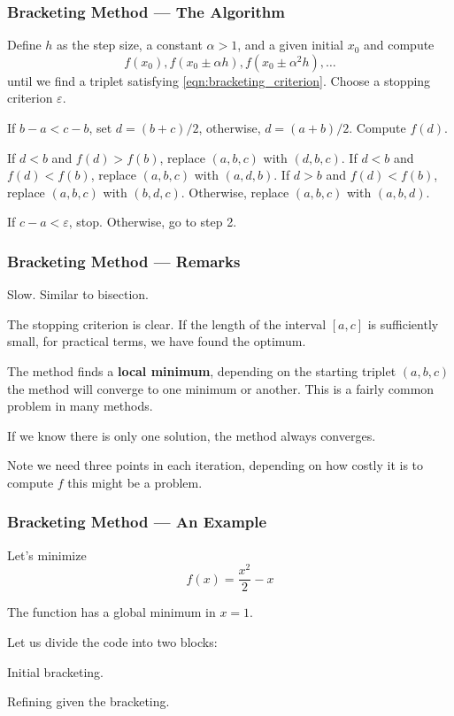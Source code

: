 \documentclass[11pt,xcolor={svgnames},aspectratio=169,usepdftitle=false]{beamer}
\let\toneitemize\itemize
\let\ttwoitemize\enditemize
\renewenvironment{itemize}{\toneitemize\addtolength{\itemsep}{0.7\baselineskip}}{\ttwoitemize}
\let\toneenumer\enumerate
\let\ttwoenumer\endenumerate
\renewenvironment{enumerate}{\toneenumer\addtolength{\itemsep}{0.7\baselineskip}}{\ttwoenumer}
\begin{document}
\begin{frame}
  \frametitle{Bracketing Method --- The Algorithm}
\begin{enumerate}
  \item Define $h$ as the step size, a constant $\alpha > 1$, and a given initial $x_0$ and compute
  \[
  f(x_0), f(x_0 \pm \alpha h), f(x_0 \pm \alpha^2 h), \ldots
  \]
  until we find a triplet satisfying \eqref{eqn:bracketing_criterion}. Choose a stopping criterion $\varepsilon$.
  \item If $b - a < c - b$, set $d = (b+c)/2$, otherwise, $d = (a+b) / 2$. Compute $f(d)$.
  \item If $d < b$ and $f(d) > f(b)$, replace $(a,b,c)$ with $(d,b,c)$. If $d<b$ and $f(d) < f(b)$, replace $(a,b,c)$ with $(a,d,b)$. If $d > b$ and $f(d) < f(b)$, replace $(a,b,c)$ with $(b,d,c)$.  Otherwise, replace $(a,b,c)$ with $(a,b,d)$.
  \item If $c - a < \varepsilon$, stop. Otherwise, go to step 2.
\end{enumerate}
\end{frame}

\begin{frame}
  \frametitle{Bracketing Method --- Remarks}
\begin{itemize}
  \item Slow. Similar to bisection.
  \item The stopping criterion is clear. If the length of the interval $[a,c]$ is sufficiently small, for practical terms, we have found the optimum.
  \item The method finds a \alert{\textbf{local minimum}}, depending on the starting triplet $(a,b,c)$ the method will converge to one minimum or another. {\tiny This is a fairly common problem in many methods.}
  \item If we know there is only one solution, the method always converges.
  \item Note we need three points in each iteration, depending on how costly it is to compute $f$ this might be a problem.
\end{itemize}
\end{frame}

\begin{frame}
  \frametitle{Bracketing Method --- An Example}
Let's minimize
\[
f(x) = \frac{x^2}{2} - x
\]
\begin{itemize}
  \item The function has a global minimum in $x = 1$.
  \item Let us divide the code into two blocks:
  \begin{enumerate}
    \item Initial bracketing.
    \item Refining given the bracketing.
  \end{enumerate}
\end{itemize}
\end{frame}
\end{document}
